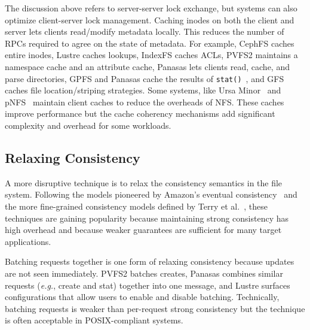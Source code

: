 The discussion above refers to server-server lock exchange, but systems can
also optimize client-server lock management. Caching inodes on both the client
and server lets clients read/modify metadata locally.  This reduces the number
of RPCs required to agree on the state of metadata.  For example, CephFS caches
entire inodes, Lustre caches lookups, IndexFS caches ACLs, PVFS2 maintains a
namespace cache and an attribute cache, Panasas lets clients read, cache, and
parse directories, GPFS and Panasas cache the results of
\texttt{stat()}~\cite{depardon:tech13-survey}, and GFS caches file
location/striping strategies.  Some systems, like Ursa
Minor~\cite{sinnamohideen:atc2010-ursa} and
pNFS~\cite{hildebrand:msst2005-pnfs} maintain client caches to reduce the
overheads of NFS. These caches improve performance but the cache coherency
mechanisms add significant complexity and overhead for some workloads.

\subsection{Relaxing Consistency}
\label{sec:relaxing-consistency}

A more disruptive technique is to relax the consistency semantics in the file
system.  Following the models pioneered by Amazon's eventual
consistency~\cite{decandia:sosp2007-dynamo} and the more fine-grained
consistency models defined by Terry et al.~\cite{terry_replicated_2013}, these
techniques are gaining popularity because maintaining strong consistency has
high overhead and because weaker guarantees are sufficient for many target
applications. 

Batching requests together is one form of relaxing consistency because updates
are not seen immediately. PVFS2 batches creates, Panasas combines similar
requests ({\it e.g.}, create and stat) together into one message, and Lustre
surfaces configurations that allow users to enable and disable batching.
Technically, batching requests is weaker than per-request strong consistency
but the technique is often acceptable in POSIX-compliant systems.

